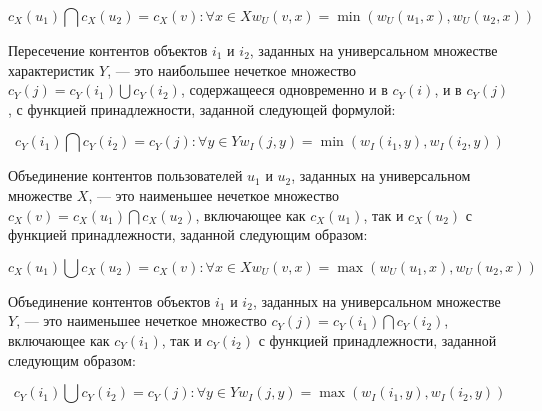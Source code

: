 \begin{equation}
				c_X(u_1) \bigcap c_X(u_2) = c_X(v): \forall x \in X w_U(v, x) =
				\min(w_U(u_1, x), w_U(u_2, x))
\end{equation}

\begin{defn}
	Пересечение контентов объектов $i_1$ и $i_2$, заданных на
	универсальном множестве характеристик
	$Y$, --- это наибольшее нечеткое множество
	$c_Y(j) = c_Y(i_1) \bigcup c_Y(i_2)$,
	содержащееся одновременно и в $c_Y(i)$, и в $c_Y(j)$,
	с функцией принадлежности, заданной следующей формулой:
\end{defn}
\begin{equation}
				c_Y(i_1) \bigcap c_Y(i_2) = c_Y(j): \forall y \in Y w_I(j, y) =
				\min(w_I(i_1, y), w_I(i_2, y))
\end{equation}

\begin{defn}
Объединение контентов пользователей $u_1$ и $u_2$,
	заданных на универсальном множестве $X$, --- это наименьшее
	нечеткое множество $c_X(v) = c_X(u_1) \bigcap c_X(u_2)$,
	включающее как $c_X(u_1)$, так и $c_X(u_2)$ с функцией
	принадлежности, заданной следующим образом:
\end{defn}
\begin{equation}
				c_X(u_1) \bigcup c_X(u_2) = c_X(v): \forall x \in X w_U(v, x) =
				\max(w_U(u_1, x), w_U(u_2, x))
\end{equation}

\begin{defn}
Объединение контентов объектов $i_1$ и $i_2$,
	заданных на универсальном множестве $Y$, --- это наименьшее
	нечеткое множество $c_Y(j) = c_Y(i_1) \bigcap c_Y(i_2)$,
	включающее как $c_Y(i_1)$, так и $c_Y(i_2)$ с функцией
	принадлежности, заданной следующим образом:
\end{defn}
\begin{equation}
				c_Y(i_1) \bigcup c_Y(i_2) = c_Y(j): \forall y \in Y w_I(j, y) =
				\max(w_I(i_1, y), w_I(i_2, y))
\end{equation}



%

